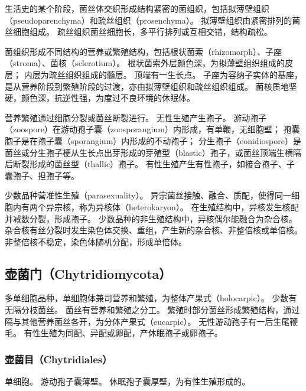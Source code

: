 \documentclass[11pt]{article}
\begin{document}
\par

生活史的某个阶段，菌丝体交织形成结构紧密的菌组织，包括拟薄壁组织（pseudoparenchyma）和疏丝组织（prosenchyma）。
拟薄壁组织由紧密排列的菌丝细胞组成。
疏丝组织菌丝细胞长，多平行排列或互相交错，结构疏松。

\par

菌组织形成不同结构的营养或繁殖结构，包括根状菌索（rhizomorph）、子座（stroma）、菌核（sclerotium）。
根状菌索外层颜色深，为拟薄壁组织组成的皮层；
内层为疏丝组织组成的髓层。
顶端有一生长点。
子座为容纳子实体的基座，是从营养阶段到繁殖阶段的过渡，亦由拟薄壁组织和疏丝组织组成。
菌核质地坚硬，颜色深，抗逆性强，为度过不良环境的休眠体。

\par

营养繁殖通过细胞分裂或菌丝断裂进行。
无性生殖产生孢子。
游动孢子（zoospore）在游动孢子囊（zoosporangium）内形成，有单鞭，无细胞壁；
孢囊胞子是在孢子囊（sporangium）内形成的不动孢子；
分生孢子（conidiospore）是菌丝或分生孢子梗从生长点出芽形成的芽殖型（blastic）孢子，或菌丝顶端生横隔后断裂形成的菌丝型（thallic）孢子。
有性生殖产生有性孢子，如接合孢子、子囊孢子、担孢子等。

\par

少数品种营准性生殖（parasexuality）。
异宗菌丝接触、融合、质配，使得同一细胞内有两个异宗核，称为异核体（heterokaryon）。
在生殖结构中，异核发生核配并减数分裂，形成孢子。
少数品种的非生殖结构中，异核偶尔能融合为杂合核。
杂合核有丝分裂时发生染色体交换、重组，产生新的杂合核、非整倍核或单倍核。
非整倍核不稳定，染色体随机分配，形成单倍体。

\subsection{壶菌门（Chytridiomycota）}
多单细胞品种，单细胞体兼司营养和繁殖，为整体产果式（holocarpic）。
少数有无隔分枝菌丝。
菌丝有营养和繁殖之分工。
繁殖时部分菌丝形成繁殖结构，通过隔与其他营养菌丝各开，为分体产果式（eucarpic）。
无性游动孢子有一后生尾鞭毛。
有性生殖为同配、异配或卵配，产休眠孢子或卵孢子。

\subsubsection{壶菌目（Chytridiales）}
单细胞。
游动孢子囊薄壁。
休眠孢子囊厚壁，为有性生殖形成的。

\par
\end{document}

